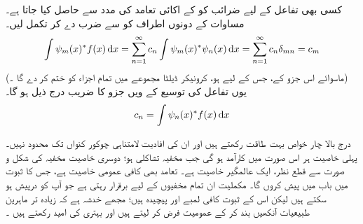 \begin{enumerate}[1.]
کسی بھی   تفاعل  کے لیے ضرائب   کو  کے  اکائی تعامد کی مدد سے حاصل کیا جاتا ہے۔ مساوات  کے دونوں اطراف کو  سے ضرب دے کر تکمل لیں۔
 \begin{align}
\int \psi_{m}(x)^*f(x)\dif{x}=\sum_{n=1}^{\infty}c_{n}\int\psi_{m}(x)^*\psi_{n}(x)\dif{x}=\sum_{n=1}^{\infty}c_{n}\delta_{mn}=c_{m}
\end{align}
(ماسوائے اس جزو کے، جس کے لیے   ہو، کرونیکر ڈیلٹا مجموعے میں تمام اجزاء کو ختم کر دے گا ۔)  یوں تفاعل  کی توسیع کے   ویں جزو کا  ضریب  درج ذیل ہو گا۔
\begin{align}\label{مساوات_شروڈنگر_عددی_سر}
c_{n}=\int\psi_{n}(x)^*f(x)\dif{x}
\end{align}
\end{enumerate}

درج بالا چار خواص بہت طاقت رکھتے ہیں اور ان کی افادیت  لامتناہی چوکور کنواں تک محدود نہیں۔ پہلی خاصیت ہر اس صورت میں کارآمد ہو گی جب مخفیہ تشاکلی ہو؛ دوسری خاصیت مخفیہ کی شکل و صورت سے قطع نظر، ایک عالمگیر خاصیت ہے۔ تعامد بھی کافی عمومی خاصیت ہے، جس کا ثبوت میں باب  میں پیش کروں گا۔ مکملیت  ان تمام مخفیوں کے لیے برقرار رہتی ہے جو آپ کو درپیش ہو سکتے ہیں لیکن اس  کے ثبوت کافی لمبے اور پیچیدہ ہیں؛ مجھے خدشہ ہے کہ زیادہ تر ماہرین طبیعیات  آنکھیں بند کر کے عمومیت فرض کر لیتے ہیں اور  بہتری کی امید رکھتے ہیں ۔

